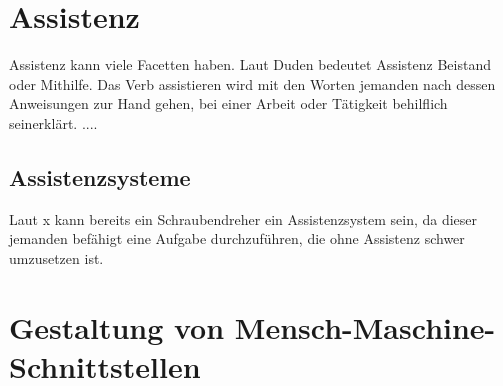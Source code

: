 \section{Assistenz}
Assistenz kann viele Facetten haben. Laut Duden bedeutet Assistenz Beistand oder Mithilfe. Das Verb assistieren wird mit den Worten \glqq jemanden nach dessen Anweisungen zur Hand gehen, bei einer Arbeit oder Tätigkeit behilflich sein\grqq erklärt.
....



\subsection{Assistenzsysteme}
Laut x kann bereits ein Schraubendreher ein Assistenzsystem sein, da dieser jemanden befähigt eine Aufgabe durchzuführen, die ohne Assistenz schwer umzusetzen ist.

\section{Gestaltung von Mensch-Maschine-Schnittstellen}